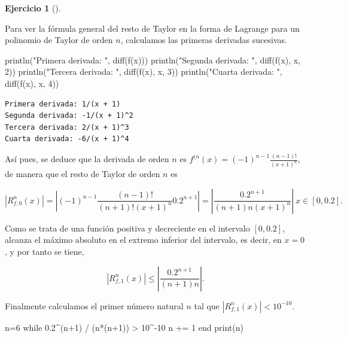 \documentclass[
  a4paper,
]{scrreport}
\newenvironment{Shaded}{\begin{snugshade}}{\end{snugshade}}
\newcommand{\ControlFlowTok}[1]{\textcolor[rgb]{0.00,0.23,0.31}{#1}}
\newcommand{\FloatTok}[1]{\textcolor[rgb]{0.68,0.00,0.00}{#1}}
\newcommand{\FunctionTok}[1]{\textcolor[rgb]{0.28,0.35,0.67}{#1}}
\newcommand{\NormalTok}[1]{\textcolor[rgb]{0.00,0.23,0.31}{#1}}
\newcommand{\OperatorTok}[1]{\textcolor[rgb]{0.37,0.37,0.37}{#1}}
\newcommand{\StringTok}[1]{\textcolor[rgb]{0.13,0.47,0.30}{#1}}
\theoremstyle{definition}
\newtheorem{exercise}{Ejercicio}[chapter]
\theoremstyle{remark}
\begin{document}
\begin{exercise}[]
\begin{tcolorbox}
Para ver la fórmula general del resto de Taylor en la forma de Lagrange
para un polinomio de Taylor de orden \(n\), calculamos las primeras
derivadas sucesivas.

\begin{Shaded}
\begin{Highlighting}[]
\FunctionTok{println}\NormalTok{(}\StringTok{"Primera derivada: "}\NormalTok{, }\FunctionTok{diff}\NormalTok{(}\FunctionTok{f}\NormalTok{(x)))}
\FunctionTok{println}\NormalTok{(}\StringTok{"Segunda derivada: "}\NormalTok{, }\FunctionTok{diff}\NormalTok{(}\FunctionTok{f}\NormalTok{(x), x, }\FloatTok{2}\NormalTok{))}
\FunctionTok{println}\NormalTok{(}\StringTok{"Tercera derivada: "}\NormalTok{, }\FunctionTok{diff}\NormalTok{(}\FunctionTok{f}\NormalTok{(x), x, }\FloatTok{3}\NormalTok{))}
\FunctionTok{println}\NormalTok{(}\StringTok{"Cuarta derivada: "}\NormalTok{, }\FunctionTok{diff}\NormalTok{(}\FunctionTok{f}\NormalTok{(x), x, }\FloatTok{4}\NormalTok{))}
\end{Highlighting}
\end{Shaded}

\begin{verbatim}
Primera derivada: 1/(x + 1)
Segunda derivada: -1/(x + 1)^2
Tercera derivada: 2/(x + 1)^3
Cuarta derivada: -6/(x + 1)^4
\end{verbatim}

Así pues, se deduce que la derivada de orden \(n\) es
\(f^{(n}(x)=(-1)^{n-1}\frac{(n-1)!}{(x+1)^n}\), de manera que el resto
de Taylor de orden \(n\) es

\[
|R^n_{f,0}(x)| = \left|(-1)^{n-1}\frac{(n-1)!}{(n+1)!(x+1)^n}0.2^{n+1}\right| = \left|\frac{0.2^{n+1}}{(n+1)n(x+1)^n}\right|\ x\in [0,0.2].
\]

Como se trata de una función positiva y decreciente en el intervalo
\([0,0.2]\), alcanza el máximo absoluto en el extremo inferior del
intervalo, es decir, en \(x=0\), y por tanto se tiene,

\[
|R^n_{f,1}(x)| \leq \left|\frac{0.2^{n+1}}{(n+1)n}\right|.
\]

Finalmente calculamos el primer número natural \(n\) tal que
\(|R^n_{f,1}(x)|<10^{-10}\).

\begin{Shaded}
\begin{Highlighting}[]
\NormalTok{n}\OperatorTok{=}\FloatTok{6}
\ControlFlowTok{while} \FloatTok{0.2}\OperatorTok{\^{}}\NormalTok{(n}\OperatorTok{+}\FloatTok{1}\NormalTok{) }\OperatorTok{/}\NormalTok{ (}\FunctionTok{n*}\NormalTok{(n}\OperatorTok{+}\FloatTok{1}\NormalTok{)) }\OperatorTok{\textgreater{}} \FloatTok{10}\OperatorTok{\^{}{-}}\FloatTok{10}
\NormalTok{    n }\OperatorTok{+=} \FloatTok{1}
\ControlFlowTok{end}
\FunctionTok{print}\NormalTok{(n)}
\end{Highlighting}
\end{Shaded}


\end{tcolorbox}
\end{exercise}
\end{document}
